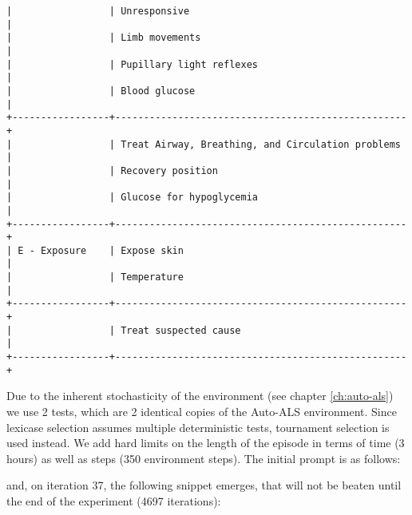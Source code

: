 \begin{lstlisting}
|                 | Unresponsive                                      |
|                 | Limb movements                                    |
|                 | Pupillary light reflexes                          |
|                 | Blood glucose                                     |
+-----------------+---------------------------------------------------+
|                 | Treat Airway, Breathing, and Circulation problems |
|                 | Recovery position                                 |
|                 | Glucose for hypoglycemia                          |
+-----------------+---------------------------------------------------+
| E - Exposure    | Expose skin                                       |
|                 | Temperature                                       |
+-----------------+---------------------------------------------------+
|                 | Treat suspected cause                             |
+-----------------+---------------------------------------------------+
\end{lstlisting}

Due to the inherent stochasticity of the environment (see chapter \ref{ch:auto-als}) we use 2 tests, which are 2 identical copies of the Auto-ALS environment.
Since lexicase selection assumes multiple deterministic tests, tournament selection is used instead.
We add hard limits on the length of the episode in terms of time (3 hours) as well as steps (350 environment steps).
The initial prompt is as follows:



and, on iteration 37, the following snippet emerges, that will not be beaten until the end of the experiment (4697 iterations):


